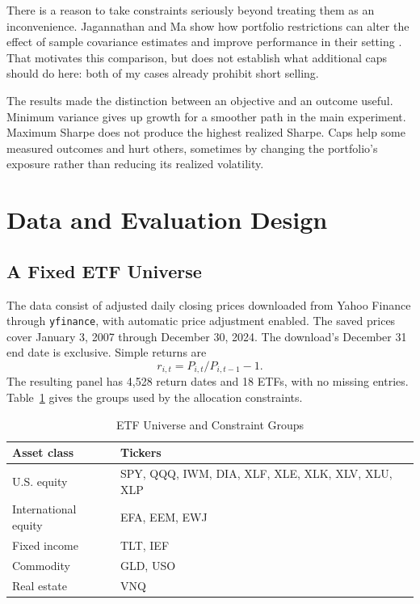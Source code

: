 \documentclass[conference]{IEEEtran}
\begin{document}
There is a reason to take constraints seriously beyond treating them as an inconvenience. Jagannathan and Ma show how portfolio restrictions can alter the effect of sample covariance estimates and improve performance in their setting \cite{jagannathan}. That motivates this comparison, but does not establish what additional caps should do here: both of my cases already prohibit short selling.

The results made the distinction between an objective and an outcome useful. Minimum variance gives up growth for a smoother path in the main experiment. Maximum Sharpe does not produce the highest realized Sharpe. Caps help some measured outcomes and hurt others, sometimes by changing the portfolio's exposure rather than reducing its realized volatility.

\section{Data and Evaluation Design}
\subsection{A Fixed ETF Universe}
The data consist of adjusted daily closing prices downloaded from Yahoo Finance through \texttt{yfinance}, with automatic price adjustment enabled. The saved prices cover January 3, 2007 through December 30, 2024. The download's December 31 end date is exclusive. Simple returns are
\begin{equation}
 r_{i,t}=P_{i,t}/P_{i,t-1}-1.
\end{equation}
The resulting panel has 4,528 return dates and 18 ETFs, with no missing entries. Table~\ref{tab:universe} gives the groups used by the allocation constraints.

\begin{table}[t]
\caption{ETF Universe and Constraint Groups}
\label{tab:universe}
\centering
\small
\begin{tabularx}{\columnwidth}{@{}lX@{}}
\toprule
Asset class & Tickers \\
\midrule
U.S. equity & SPY, QQQ, IWM, DIA, XLF, XLE, XLK, XLV, XLU, XLP \\
International equity & EFA, EEM, EWJ \\
Fixed income & TLT, IEF \\
Commodity & GLD, USO \\
Real estate & VNQ \\
\bottomrule
\end{tabularx}
\end{table}
\end{document}
